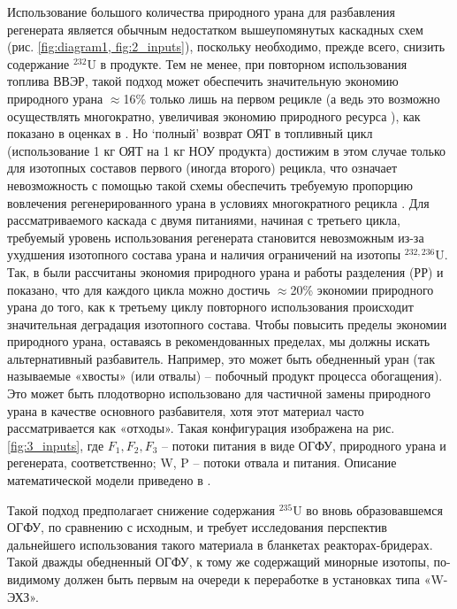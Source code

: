 Использование большого количества природного урана для разбавления регенерата является обычным недостатком вышеупомянутых каскадных схем (рис. \ref{fig:diagram1, fig:2_inputs}), поскольку необходимо, прежде всего, снизить содержание $^{232}$U в продукте. Тем не менее, при повторном использования топлива ВВЭР, такой подход может обеспечить значительную экономию природного урана $\approx$16\% только лишь на первом рецикле (а ведь это возможно осуществлять многократно, увеличивая экономию природного ресурса \cite{colemanEvaluationMultipleSelfrecycling2010}), как показано в оценках в \cite{smirnovEvolutionIsotopicComposition2012}. Но `полный' возврат ОЯТ в топливный цикл (использование 1 кг ОЯТ на 1 кг НОУ продукта) достижим в этом случае только для изотопных составов первого (иногда второго) рецикла, что означает невозможность с помощью такой схемы обеспечить требуемую пропорцию вовлечения регенерированного урана в условиях многократного рецикла \cite{smirnovApplyingEnrichmentCapacities2018}.
Для рассматриваемого каскада с двумя питаниями, начиная с третьего цикла, требуемый уровень использования регенерата становится невозможным из-за ухудшения изотопного состава урана и наличия ограничений на изотопы $^{232,236}$U.
Так, в \cite{smirnovApplyingEnrichmentCapacities2018} были рассчитаны экономия природного урана и работы разделения (РР) и показано, что для каждого цикла можно достичь $\approx$20\% экономии природного урана до того, как к третьему циклу повторного использования происходит значительная деградация изотопного состава.
Чтобы повысить пределы экономии природного урана, оставаясь в рекомендованных пределах, мы должны искать альтернативный разбавитель. Например, это может быть обедненный уран (так называемые «хвосты» (или отвалы) -- побочный продукт процесса обогащения). Это может быть плодотворно использовано для частичной замены природного урана в качестве основного разбавителя, хотя этот материал часто рассматривается как «отходы». Такая конфигурация изображена на рис. \ref{fig:3_inputs}, где $F_{1}, F_{2}, F_{3}$ -- потоки питания в виде ОГФУ, природного урана и регенерата, соответственно; W, P -- потоки отвала и питания. Описание математической модели приведено в \cite{smirnovEnrichmentRegeneratedUranium2014}.

Такой подход предполагает снижение содержания $^{235}$U во вновь образовавшемся ОГФУ, по сравнению с исходным, и требует исследования перспектив дальнейшего использования такого материала в бланкетах реакторах-бридерах. Такой дважды обедненный ОГФУ, к тому же содержащий минорные изотопы, по-видимому должен быть первым на очереди к переработке в установках типа «W-ЭХЗ».

